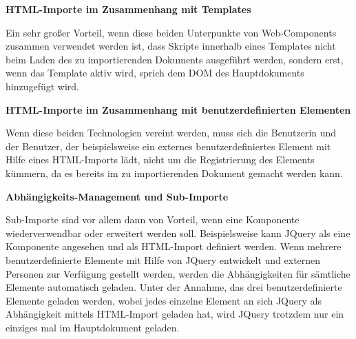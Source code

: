 \textbf{HTML-Importe im Zusammenhang mit Templates}

Ein sehr großer Vorteil, wenn diese beiden Unterpunkte von Web-Components zusammen verwendet werden ist, dass Skripte innerhalb eines Templates nicht beim Laden des zu importierenden Dokuments ausgeführt werden, sondern erst, wenn das Template aktiv wird, sprich dem DOM des Hauptdokuments hinzugefügt wird.

\textbf{HTML-Importe im Zusammenhang mit benutzerdefinierten Elementen}

Wenn diese beiden Technologien vereint werden, muss sich die Benutzerin und der Benutzer, der beispielsweise ein externes benutzerdefiniertes Element mit Hilfe eines HTML-Imports lädt, nicht um die Registrierung des Elements kümmern, da es bereits im zu importierenden Dokument gemacht werden kann.

\textbf{Abhängigkeits-Management und Sub-Importe}

Sub-Importe sind vor allem dann von Vorteil, wenn eine Komponente wiederverwendbar oder erweitert werden soll. Beispielsweise kann JQuery als eine Komponente angesehen und als HTML-Import definiert werden. Wenn mehrere  benutzerdefinierte Elemente mit Hilfe von JQuery entwickelt und externen Personen zur Verfügung gestellt werden, werden die Abhängigkeiten für sämtliche Elemente automatisch geladen. Unter der Annahme, das drei benutzerdefinierte Elemente geladen werden, wobei jedes einzelne Element an sich JQuery als Abhängigkeit mittels HTML-Import geladen hat, wird JQuery trotzdem nur ein einziges mal im Hauptdokument geladen.